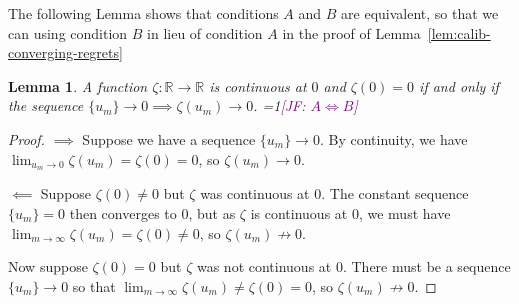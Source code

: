 \documentclass[11pt]{article} %
\newcommand{\Comments}{1}
\newcommand{\mynote}[2]{\ifnum\Comments=1\textcolor{#1}{#2}\fi}
\newcommand{\jessie}[1]{\mynote{purple}{[JF: #1]}}
\newcommand{\reals}{\mathbb{R}}
\newtheorem{lemma}{Lemma}
\begin{document}
The following Lemma shows that conditions $A$ and $B$ are equivalent, so that we can using condition $B$ in lieu of condition $A$ in the proof of Lemma~\ref{lem:calib-converging-regrets}
\begin{lemma}\label{lem:continuous-iff-limits}
	A function $\zeta:\reals \to \reals$ is continuous at $0$ and $\zeta(0) = 0$ if and only if the sequence $\{u_m\} \to 0 \implies \zeta(u_m) \to 0$.
	\jessie{$A \iff B$}
\end{lemma}
\begin{proof}
	$\implies$ Suppose we have a sequence $\{u_m\} \to 0$.
	By continuity, we have $\lim_{u_m \to 0}\zeta(u_m) = \zeta(0) = 0$, so $\zeta(u_m) \to 0$.
	
	$\impliedby$ Suppose $\zeta(0) \neq 0$ but $\zeta$ was continuous at $0$.
	The constant sequence $\{u_m\} = 0$ then converges to $0$, but as $\zeta$ is continuous at $0$, we must have $\lim_{m \to \infty}\zeta(u_m) = \zeta(0) \neq 0$, so $\zeta(u_m) \not \to 0$.
	
	Now suppose $\zeta(0) = 0$ but $\zeta$ was not continuous at $0$.
	There must be a sequence $\{u_m\} \to 0$ so that $\lim_{m \to \infty}\zeta(u_m) \neq \zeta(0) = 0$, so $\zeta(u_m) \not \to 0$.
\end{proof}
\end{document}
